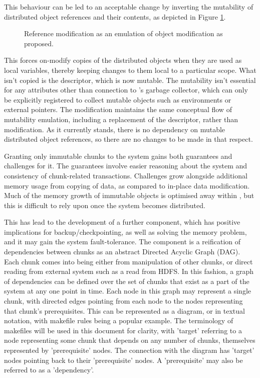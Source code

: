 This behaviour can be led to an acceptable change by inverting the mutability of distributed object references and their contents, as depicted in Figure \ref{fig:modifyrefprop}.

\begin{figure}

\caption{Reference modification as an emulation of object modification as proposed.}
\label{fig:modifyrefprop}
\end{figure}

This forces on-modify copies of the distributed objects when they are used as local variables, thereby keeping changes to them local to a particular scope.
What isn't copied is the descriptor, which is now mutable.
The mutability isn't essential for any attributes other than connection to \R{}'s garbage collector, which can only be explicitly registered to collect mutable objects such as environments or external pointers.
The modification maintains the same conceptual flow of mutability emulation, including a replacement of the descriptor, rather than modification.
As it currently stands, there is no \lsr{} dependency on mutable distributed object references, so there are no changes to be made in that respect.

Granting only immutable chunks to the \lsr{} system gains both guarantees and challenges for it.
The guarantees involve easier reasoning about the system and consistency of chunk-related transactions\cite{goetz2006java}.
Challenges grow alongside additional memory usage from copying of data, as compared to in-place data modification.
Much of the memory growth of immutable objects is optimised away within \R{}, but this is difficult to rely upon once the system becomes distributed\cite{rcore2020lang}.

This has lead to the development of a further component, which has positive implications for backup/checkpointing, as well as solving the memory problem, and it may gain the system fault-tolerance.
The component is a reification of dependencies between chunks as an abstract Directed Acyclic Graph (DAG).
Each chunk comes into being either from manipulation of other chunks, or direct reading from external system such as a read from HDFS.
In this fashion, a graph of dependencies can be defined over the set of chunks that exist as a part of the system at any one point in time.
Each node in this graph may represent a single chunk, with directed edges pointing from each node to the nodes representing that chunk's prerequisites.
This can be represented as a diagram, or in textual notation, with makefile rules being a popular example\cite{shal2009build}.
The terminology of makefiles will be used in this document for clarity, with 'target' referring to a node representing some chunk that depends on any number of chunks, themselves represented by 'prerequisite' nodes. 
The connection with the diagram has 'target' nodes pointing back to their 'prerequisite' nodes.
A 'prerequisite' may also be referred to as a 'dependency'.

